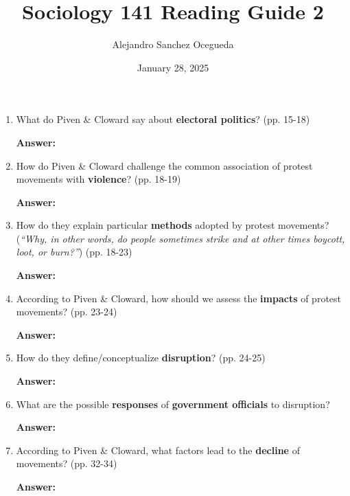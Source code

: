\documentclass{article}
\title{Sociology 141 Reading Guide 2}
\author{Alejandro Sanchez Ocegueda}
\date{January 28, 2025}
\newcommand{\answer}{\textbf{Answer:}$\;$}
\begin{document}
\maketitle

\begin{enumerate}[label=\arabic*)]
    \item What do Piven \& Cloward say about \textbf{electoral politics}? (pp. 15-18)

    \answer 

    \item How do Piven \& Cloward challenge the common association of protest movements with \textbf{violence}? (pp. 18-19)

    \answer 

    \item 
    How do they explain particular \textbf{methods} adopted by protest movements?
    (\textit{``Why, in other words, do people sometimes strike and at other times boycott, loot, or burn?''}) (pp. 18-23)

    \answer


    \item According to Piven \& Cloward, how should we assess the \textbf{impacts} of protest movements? (pp. 23-24)

    \answer 

    \item How do they define/conceptualize \textbf{disruption}? (pp. 24-25)

    \answer

    \item What are the possible \textbf{responses} of \textbf{government officials} to disruption?

    \answer

    \item According to Piven \& Cloward, what factors lead to the \textbf{decline} of movements? (pp. 32-34)

    \answer
    
\end{enumerate}
 
\end{document}
